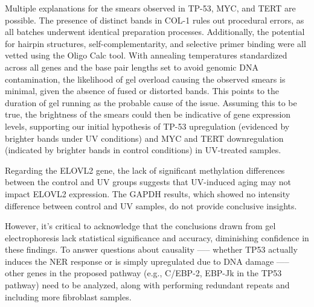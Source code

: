 \documentclass[letterpaper,11pt]{article}
\begin{document}
Multiple explanations for the smears observed in TP-53, MYC, and TERT are possible. The presence of distinct bands in COL-1 rules out procedural errors, as all batches underwent identical preparation processes. Additionally, the potential for hairpin structures, self-complementarity, and selective primer binding were all vetted using the Oligo Calc tool. With annealing temperatures standardized across all genes and the base pair lengths set to avoid genomic DNA contamination, the likelihood of gel overload causing the observed smears is minimal, given the absence of fused or distorted bands. This points to the duration of gel running as the probable cause of the issue\cite{ref:gel}. Assuming this to be true, the brightness of the smears could then be indicative of gene expression levels, supporting our initial hypothesis of TP-53 upregulation (evidenced by brighter bands under UV conditions) and MYC and TERT downregulation (indicated by brighter bands in control conditions) in UV-treated samples.

Regarding the ELOVL2 gene, the lack of significant methylation differences between the control and UV groups suggests that UV-induced aging may not impact ELOVL2 expression. The GAPDH results, which showed no intensity difference between control and UV samples, do not provide conclusive insights.

However, it's critical to acknowledge that the conclusions drawn from gel electrophoresis lack statistical significance and accuracy, diminishing confidence in these findings. To answer questions about causality —-- whether TP53 actually induces the NER response or is simply upregulated due to DNA damage —-- other genes in the proposed pathway (e.g., C/EBP-2, EBP-Jk in the TP53 pathway) need to be analyzed, along with performing redundant repeats and including more fibroblast samples.



\end{document}
